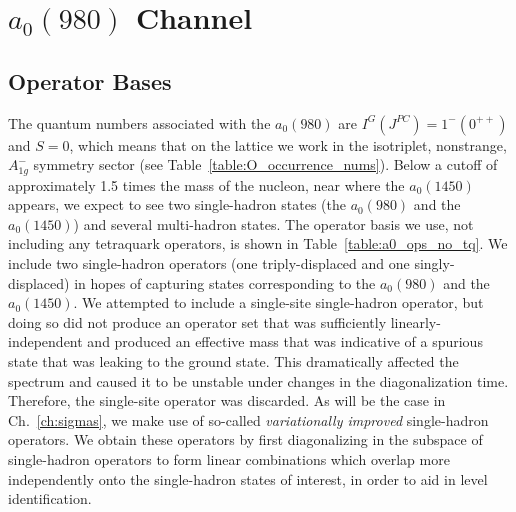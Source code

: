 \section{$a_0(980)$ Channel}\label{sec:a0}
\subsection{Operator Bases}
The quantum numbers associated with the $a_0(980)$ are $I^G(J^{PC}) = 1^-(0^{++})$ and $S = 0$, which means that on the lattice we work in the isotriplet, nonstrange, $A_{1g}^-$ symmetry sector (see Table~\ref{table:O_occurrence_nums}). Below a cutoff of approximately 1.5 times the mass of the nucleon, near where the $a_0(1450)$ appears, we expect to see two single-hadron states (the $a_0(980)$ and the $a_0(1450)$) and several multi-hadron states. The operator basis we use, not including any tetraquark operators, is shown in Table~\ref{table:a0_ops_no_tq}. We include two single-hadron operators (one triply-displaced and one singly-displaced) in hopes of capturing states corresponding to the $a_0(980)$ and the $a_0(1450)$. We attempted to include a single-site single-hadron operator, but doing so did not produce an operator set that was sufficiently linearly-independent and produced an effective mass that was indicative of a spurious state that was leaking to the ground state. This dramatically affected the spectrum and caused it to be unstable under changes in the diagonalization time. Therefore, the single-site operator was discarded. As will be the case in Ch.~\ref{ch:sigmas}, we make use of so-called \emph{variationally improved} single-hadron operators. We obtain these operators by first diagonalizing in the subspace of single-hadron operators to form linear combinations which overlap more independently onto the single-hadron states of interest, in order to aid in level identification.

